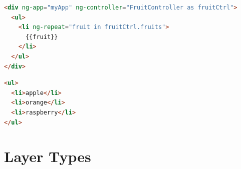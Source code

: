 \begin{lstlisting}[language=html, caption=AngularJS template, label=lst:angular-view]
<div ng-app="myApp" ng-controller="FruitController as fruitCtrl">
  <ul>
    <li ng-repeat="fruit in fruitCtrl.fruits">
      {{fruit}}
    </li>
  </ul>
</div>
\end{lstlisting}

\begin{lstlisting}[language=html, caption=HTML result, label=lst:angular-result]
<ul>
  <li>apple</li>
  <li>orange</li>
  <li>raspberry</li>
</ul>
\end{lstlisting}



\section{Layer Types}
